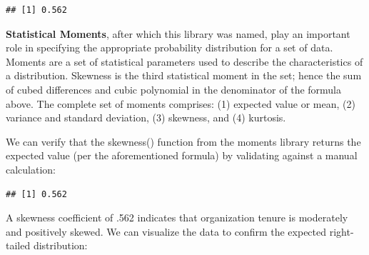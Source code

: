 \documentclass[]{book}
\newenvironment{Shaded}{\begin{snugshade}}{\end{snugshade}}
\newcommand{\CommentTok}[1]{\textcolor[rgb]{0.56,0.35,0.01}{\textit{#1}}}
\newcommand{\DecValTok}[1]{\textcolor[rgb]{0.00,0.00,0.81}{#1}}
\newcommand{\KeywordTok}[1]{\textcolor[rgb]{0.13,0.29,0.53}{\textbf{#1}}}
\newcommand{\NormalTok}[1]{#1}
\newcommand{\OperatorTok}[1]{\textcolor[rgb]{0.81,0.36,0.00}{\textbf{#1}}}
\newcommand{\StringTok}[1]{\textcolor[rgb]{0.31,0.60,0.02}{#1}}
\begin{document}
\begin{verbatim}
## [1] 0.562
\end{verbatim}

\textbf{Statistical Moments}, after which this library was named, play an important role in specifying the appropriate probability distribution for a set of data. Moments are a set of statistical parameters used to describe the characteristics of a distribution. Skewness is the third statistical moment in the set; hence the sum of cubed differences and cubic polynomial in the denominator of the formula above. The complete set of moments comprises: (1) expected value or mean, (2) variance and standard deviation, (3) skewness, and (4) kurtosis.

We can verify that the skewness() function from the moments library returns the expected value (per the aforementioned formula) by validating against a manual calculation:

\begin{Shaded}
\end{Shaded}

\begin{verbatim}
## [1] 0.562
\end{verbatim}

A skewness coefficient of .562 indicates that organization tenure is moderately and positively skewed. We can visualize the data to confirm the expected right-tailed distribution:
\end{document}
